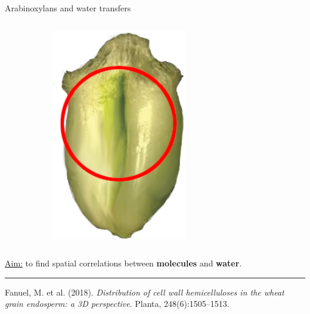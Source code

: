 \documentclass[10pt]{beamer}
\let\oldfootnotesize\footnotesize
\renewcommand*{\footnotesize}{\oldfootnotesize\tiny}
\begin{document}
\begin{frame}{Arabinoxylans and water transfers}
\begin{columns}[totalwidth=\textwidth]
\begin{column}[c]{0.4\linewidth}
\begin{figure}[ht]
\begin{subfigure}[t]{0.45\textwidth}
          \includegraphics[width=0.65\textwidth]{fig/water_transfer}
          \label{subfig:water_transfer}
        \end{subfigure}%
      \end{figure}
    \end{column}
  \end{columns}
  

  \underline{Aim:} to find spatial correlations between \textbf{molecules} and \textbf{water}.\\

  \vspace{0.5cm}
  \hrule width0.3\textwidth
  {
    \footnotesize
    Fanuel, M. et al. (2018).
    \textit{Distribution of cell wall hemicelluloses in the wheat grain endosperm: a 3D perspective}.
    Planta, 248(6):1505–1513.
  }
   \end{frame}
\end{document}
